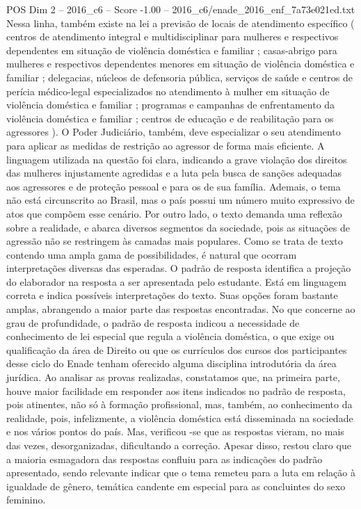 \begin{textsample}{POS Dim 2 – 2016\_c6 – Score -1.00 – 2016\_c6/enade\_2016\_enf\_7a73e021ed.txt}
Nessa linha, também existe na lei a previsão de locais de atendimento específico ( centros de atendimento integral e multidisciplinar para mulheres e respectivos dependentes em situação de violência doméstica e familiar ; casas-abrigo para mulheres e respectivos dependentes menores em situação de violência doméstica e familiar ; delegacias, núcleos de defensoria pública, serviços de saúde e centros de perícia médico-legal especializados no atendimento à mulher em situação de violência doméstica e familiar ; programas e campanhas de enfrentamento da violência doméstica e familiar ; centros de educação e de reabilitação para os agressores ).
O Poder Judiciário, também, deve especializar o seu atendimento para aplicar as medidas de restrição ao agressor de forma mais eficiente.
A linguagem utilizada na questão foi clara, indicando a grave violação dos direitos das mulheres injustamente agredidas e a luta pela busca de sanções adequadas aos agressores e de proteção pessoal e para os de sua família.
Ademais, o tema não está circunscrito ao Brasil, mas o país possui um número muito expressivo de atos que compõem esse cenário.
Por outro lado, o texto demanda uma reflexão sobre a realidade, e abarca diversos segmentos da sociedade, pois as situações de agressão não se restringem às camadas mais populares.
Como se trata de texto contendo uma ampla gama de possibilidades, é natural que ocorram interpretações diversas das esperadas.
O padrão de resposta identifica a projeção do elaborador na resposta a ser apresentada pelo estudante.
Está em linguagem correta e indica possíveis interpretações do texto.
Suas opções foram bastante amplas, abrangendo a maior parte das respostas encontradas.
No que concerne ao grau de profundidade, o padrão de resposta indicou a necessidade de conhecimento de lei especial que regula a violência doméstica, o que exige ou qualificação da área de Direito ou que os currículos dos cursos dos participantes desse ciclo do Enade tenham oferecido alguma disciplina introdutória da área jurídica.
Ao analisar as provas realizadas, constatamos que, na primeira parte, houve maior facilidade em responder aos itens indicados no padrão de resposta, pois atinentes, não só à formação profissional, mas, também, ao conhecimento da realidade, pois, infelizmente, a violência doméstica está disseminada na sociedade e nos vários pontos do país.
Mas, verificou -se que as respostas vieram, no mais das vezes, desorganizadas, dificultando a correção.
Apesar disso, restou claro que a maioria esmagadora das respostas confluiu para as indicações do padrão apresentado, sendo relevante indicar que o tema remeteu para a luta em relação à igualdade de gênero, temática candente em especial para as concluintes do sexo feminino.

\end{textsample}
